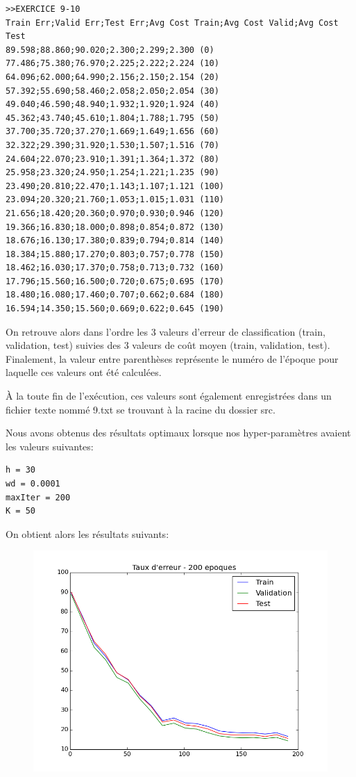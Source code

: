\documentclass[a4paper,11pt]{article}
\begin{document}
\begin{verbatim}
>>EXERCICE 9-10
Train Err;Valid Err;Test Err;Avg Cost Train;Avg Cost Valid;Avg Cost Test
89.598;88.860;90.020;2.300;2.299;2.300 (0)
77.486;75.380;76.970;2.225;2.222;2.224 (10)
64.096;62.000;64.990;2.156;2.150;2.154 (20)
57.392;55.690;58.460;2.058;2.050;2.054 (30)
49.040;46.590;48.940;1.932;1.920;1.924 (40)
45.362;43.740;45.610;1.804;1.788;1.795 (50)
37.700;35.720;37.270;1.669;1.649;1.656 (60)
32.322;29.390;31.920;1.530;1.507;1.516 (70)
24.604;22.070;23.910;1.391;1.364;1.372 (80)
25.958;23.320;24.950;1.254;1.221;1.235 (90)
23.490;20.810;22.470;1.143;1.107;1.121 (100)
23.094;20.320;21.760;1.053;1.015;1.031 (110)
21.656;18.420;20.360;0.970;0.930;0.946 (120)
19.366;16.830;18.000;0.898;0.854;0.872 (130)
18.676;16.130;17.380;0.839;0.794;0.814 (140)
18.384;15.880;17.270;0.803;0.757;0.778 (150)
18.462;16.030;17.370;0.758;0.713;0.732 (160)
17.796;15.560;16.500;0.720;0.675;0.695 (170)
18.480;16.080;17.460;0.707;0.662;0.684 (180)
16.594;14.350;15.560;0.669;0.622;0.645 (190)
\end{verbatim}

On retrouve alors dans l'ordre les 3 valeurs d'erreur de classification (train, validation, test) suivies des 3 valeurs de coût moyen (train, validation, test). Finalement, la valeur entre parenthèses représente le numéro de l'époque pour laquelle ces valeurs ont été calculées.

À la toute fin de l'exécution, ces valeurs sont également enregistrées dans un fichier texte nommé 9.txt se trouvant à la racine du dossier src.

\newpage

Nous avons obtenus des résultats optimaux lorsque nos hyper-paramètres avaient les valeurs suivantes:

\begin{verbatim}
h = 30
wd = 0.0001
maxIter = 200
K = 50
\end{verbatim}

On obtient alors les résultats suivants:

\begin{figure}[H]
	\includegraphics[width=15cm]{images/best_taux_erreur.png}
	\centering
	\label{fig:comp}
\end{figure}
\end{document}
